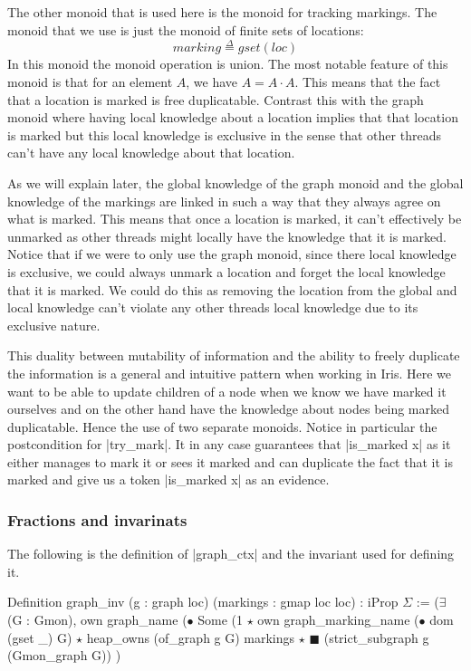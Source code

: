 \documentclass[]{scrartcl}
\newcommand{\defeq}{\overset{\Delta}{=}}
\newcommand{\loc}{\mathit{loc}}
\newcommand{\finset}{\mathit{gset}}
\begin{document}
The other monoid that is used here is the monoid for tracking markings.
The monoid that we use is just the monoid of finite sets of locations:
\[
\mathit{marking} \defeq \finset(\loc)
\]
In this monoid the monoid operation is union.
The most notable feature of this monoid is that for an element $A$, we have $A = A \cdot A$.
This means that the fact that a location is marked is free duplicatable.
Contrast this with the graph monoid where having local knowledge
about a location implies that that location is marked but this
local knowledge is exclusive in the sense that other threads can't
have any local knowledge about that location.

As we will explain later, the global knowledge of the graph monoid and
the global knowledge of the markings are linked in such a way that
they always agree on what is marked.
This means that once a location is marked, it can't effectively be unmarked as other threads might locally have the knowledge that
it is marked.
Notice that if we were to only use the graph monoid, since there
local knowledge is exclusive, we could always unmark a location
and forget the local knowledge that it is marked.
We could do this as removing the location from the global and
local knowledge can't violate any other threads local knowledge due to
its exclusive nature.

This duality between mutability of information and the ability to freely
duplicate the information is a general and intuitive pattern when working
in Iris.
Here we want to be able to update children of a node when we know
we have marked it ourselves and on the other hand have the knowledge
about nodes being marked duplicatable. Hence the use of two separate
monoids.
Notice in particular the postcondition for \Coqe|try_mark|. It in any case
guarantees that \Coqe|is_marked x| as it either manages to mark it or
sees it marked and can duplicate the fact that it is marked and
give us a token \Coqe|is_marked x| as an evidence.

\subsubsection{Fractions and invarinats}
The following is the definition of \Coqe|graph_ctx| and the invariant
used for defining it.
\begin{Coq}
Definition graph_inv (g : graph loc) (markings : gmap loc loc)
: iProp $\Sigma$ :=
    ($\exists$ (G : Gmon), own graph_name ($\bullet$ Some (1%
      $\star$ own graph_marking_name ($\bullet$ dom (gset _) G)
      $\star$ heap_owns (of_graph g G) markings $\star$
      $\scriptscriptstyle\blacksquare$ (strict_subgraph g (Gmon_graph G))
    )%
\end{Coq}
\end{document}
